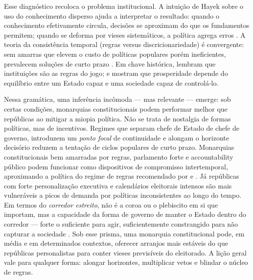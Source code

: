 Esse diagnóstico recoloca o problema institucional. A intuição de Hayek sobre o uso do conhecimento disperso ajuda a interpretar o resultado: quando o conhecimento efetivamente circula, decisões se aproximam do que os fundamentos permitem; quando se deforma por vieses sistemáticos, a política agrega erros \cite{hayek_knowledge_use}. A teoria da consistência temporal (regras versus discricionariedade) é convergente: sem amarras que elevem o custo de políticas populares porém ineficientes, prevalecem soluções de curto prazo \cite{prescott1977,barro1983}. Em chave histórica,  lembram que instituições são as regras do jogo; e  mostram que prosperidade depende do equilíbrio entre um Estado capaz e uma sociedade capaz de controlá-lo.

Nessa gramática, uma inferência incômoda — mas relevante — emerge: sob certas condições, monarquias constitucionais podem performar melhor que repúblicas ao mitigar a miopia política. Não se trata de nostalgia de formas políticas, mas de incentivos. Regimes que separam chefe de Estado de chefe de governo, introduzem um \textit{ponto focal} de continuidade e alongam o horizonte decisório reduzem a tentação de ciclos populares de curto prazo. Monarquias constitucionais bem amarradas por regras, parlamento forte e accountability público podem funcionar como dispositivos de compromisso intertemporal, aproximando a política do regime de regras recomendado por  e . Já repúblicas com forte personalização executiva e calendários eleitorais intensos são mais vulneráveis a picos de demanda por políticas inconsistentes ao longo do tempo. Em termos do \textit{corredor estreito}, não é a coroa ou o plebiscito em si que importam, mas a capacidade da forma de governo de manter o Estado dentro do corredor — forte o suficiente para agir, suficientemente constrangido para não capturar a sociedade \cite{acemoglu2019narrow}. Sob esse prisma, uma monarquia constitucional pode, em média e em determinados contextos, oferecer arranjos mais estáveis do que repúblicas personalistas para conter vieses previsíveis do eleitorado. A lição geral vale para qualquer forma: alongar horizontes, multiplicar vetos e blindar o núcleo de regras.

